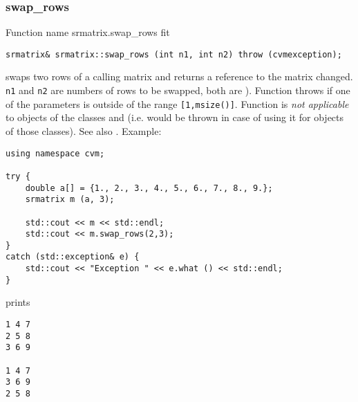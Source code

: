 \subsubsection{swap\_rows}
Function%
\pdfdest name {srmatrix.swap_rows} fit
\begin{verbatim}
srmatrix& srmatrix::swap_rows (int n1, int n2) throw (cvmexception);
\end{verbatim}
swaps two rows of a calling matrix and returns a reference to
the matrix changed. \verb"n1" and \verb"n2" are
numbers of rows to be swapped, 
both are \Based).
Function throws  
if one of the parameters is outside of the range
\verb"[1,msize()]".
Function is 
\emph{not applicable} to objects of the classes
 and
 (i.e.  would be thrown
in case of using it for objects of those classes).
See also .
Example:
\begin{Verbatim}
using namespace cvm;

try {
    double a[] = {1., 2., 3., 4., 5., 6., 7., 8., 9.};
    srmatrix m (a, 3);

    std::cout << m << std::endl;
    std::cout << m.swap_rows(2,3);
}
catch (std::exception& e) {
    std::cout << "Exception " << e.what () << std::endl;
}
\end{Verbatim}
prints
\begin{Verbatim}
1 4 7
2 5 8
3 6 9

1 4 7
3 6 9
2 5 8
\end{Verbatim}
\newpage


